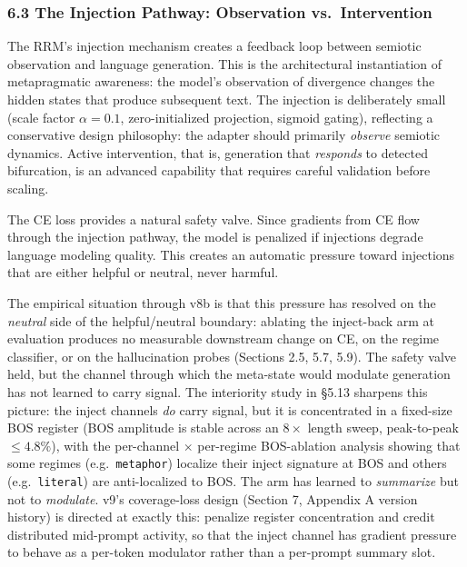 \documentclass[
  11pt]{article}
\begin{document}
\subsubsection{6.3 The Injection Pathway: Observation
vs.~Intervention}\label{the-injection-pathway-observation-vs.-intervention}

The RRM's injection mechanism creates a feedback loop between semiotic
observation and language generation. This is the architectural
instantiation of metapragmatic awareness: the model's observation of
divergence changes the hidden states that produce subsequent text. The
injection is deliberately small (scale factor \(\alpha = 0.1\),
zero-initialized projection, sigmoid gating), reflecting a conservative
design philosophy: the adapter should primarily \emph{observe} semiotic
dynamics. Active intervention, that is, generation that \emph{responds}
to detected bifurcation, is an advanced capability that requires careful
validation before scaling.

The CE loss provides a natural safety valve. Since gradients from CE
flow through the injection pathway, the model is penalized if injections
degrade language modeling quality. This creates an automatic pressure
toward injections that are either helpful or neutral, never harmful.

The empirical situation through v8b is that this pressure has resolved
on the \emph{neutral} side of the helpful/neutral boundary: ablating the
inject-back arm at evaluation produces no measurable downstream change
on CE, on the regime classifier, or on the hallucination probes
(Sections 2.5, 5.7, 5.9). The safety valve held, but the channel through
which the meta-state would modulate generation has not learned to carry
signal. The interiority study in §5.13 sharpens this picture: the inject
channels \emph{do} carry signal, but it is concentrated in a fixed-size
BOS register (BOS amplitude is stable across an \(8\times\) length
sweep, peak-to-peak \(\leq 4.8\%\)), with the per-channel \(\times\)
per-regime BOS-ablation analysis showing that some regimes
(e.g.~\texttt{metaphor}) localize their inject signature at BOS and
others (e.g.~\texttt{literal}) are anti-localized to BOS. The arm has
learned to \emph{summarize} but not to \emph{modulate}. v9's
coverage-loss design (Section 7, Appendix A version history) is directed
at exactly this: penalize register concentration and credit distributed
mid-prompt activity, so that the inject channel has gradient pressure to
behave as a per-token modulator rather than a per-prompt summary slot.
\end{document}
